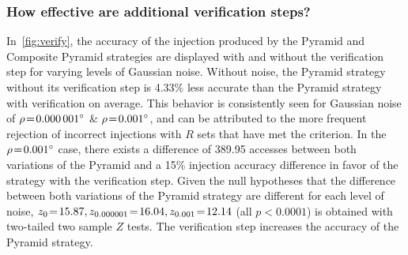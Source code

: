 \subsubsection{How effective are additional verification steps?}
%
%
%
%
%
%

In~\autoref{fig:verify}, the accuracy of the injection produced by the Pyramid and Composite Pyramid strategies are
displayed with and without the verification step for varying levels of Gaussian noise.
Without noise, the Pyramid strategy without its verification step is 4.33\% less accurate than the Pyramid strategy with
verification on average.
This behavior is consistently seen for Gaussian noise of $\rho\!=\!\ang{0.000001}$ \& $\rho\!=\!\ang{0.001}$, and
can be attributed to the more frequent rejection of incorrect injections with $R$ sets that have met the criterion.
In the $\rho\!=\!\ang{0.001}$ case, there exists a difference of 389.95 accesses between both variations of the Pyramid
and a 15\% injection accuracy difference in favor of the strategy with the verification step.
Given the null hypotheses that the difference between both variations of the Pyramid strategy are different for each
level of noise, $z_0 \!=\! 15.87, z_{0.000001} \!=\! 16.04, z_{0.001} \!=\! 12.14$ (all $p\!<\!0.0001$) is obtained with
two-tailed two sample $Z$ tests.
The verification step increases the accuracy of the Pyramid strategy.

